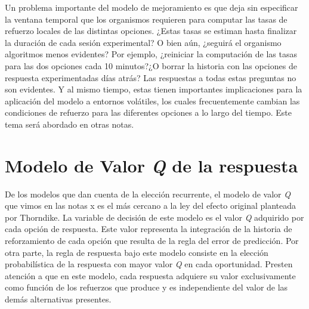 \documentclass[
  a4paper,
  DIV=11,
  numbers=noendperiod]{scrreprt}
\begin{document}
Un problema importante del modelo de mejoramiento es que deja sin
especificar la ventana temporal que los organismos requieren para
computar las tasas de refuerzo locales de las distintas opciones. ¿Estas
tasas se estiman hasta finalizar la duración de cada sesión
experimental? O bien aún, ¿seguirá el organismo algoritmos menos
evidentes? Por ejemplo, ¿reiniciar la computación de las tasas para las
dos opciones cada 10 minutos?¿O borrar la historia con las opciones de
respuesta experimentadas días atrás? Las respuestas a todas estas
preguntas no son evidentes. Y al mismo tiempo, estas tienen importantes
implicaciones para la aplicación del modelo a entornos volátiles, los
cuales frecuentemente cambian las condiciones de refuerzo para las
diferentes opciones a lo largo del tiempo. Este tema será abordado en
otras notas.

\section{\texorpdfstring{Modelo de Valor \emph{Q} de la
respuesta}{Modelo de Valor Q de la respuesta}}\label{modelo-de-valor-q-de-la-respuesta}

De los modelos que dan cuenta de la elección recurrente, el modelo de
valor \emph{Q} que vimos en las notas x es el más cercano a la ley del
efecto original planteada por Thorndike. La variable de decisión de este
modelo es el valor \emph{Q} adquirido por cada opción de respuesta. Este
valor representa la integración de la historia de reforzamiento de cada
opción que resulta de la regla del error de predicción. Por otra parte,
la regla de respuesta bajo este modelo consiste en la elección
probabilística de la respuesta con mayor valor \emph{Q} en cada
oportunidad. Presten atención a que en este modelo, cada respuesta
adquiere su valor exclusivamente como función de los refuerzos que
produce y es independiente del valor de las demás alternativas
presentes.
\end{document}
